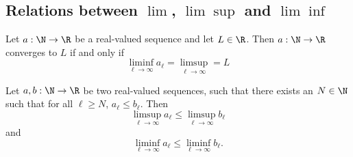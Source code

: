 \subsection{Relations between \texorpdfstring{$\lim$}{lim}, \texorpdfstring{$\lim\sup$}{limsup} and \texorpdfstring{$\lim\inf$}{liminf}}
\begin{proposition}
    Let $a: \N \to \R$ be a real-valued sequence and let $L \in \R$. Then $a: \N \to \R$ converges to $L$ if and only if
    $$\liminf_{\ell\to\infty}a_\ell = \limsup_{\ell\to\infty} = L$$
\end{proposition}

\begin{proposition}
    Let $a,b: \N \to \R$ be two real-valued sequences, such that there exists an $N \in \N$ such that for all $\ell \ge N$,
    $a_\ell \le b_\ell.$ Then
    $$\limsup_{\ell\to\infty}a_\ell \le \limsup_{\ell\to\infty}b_\ell$$ and 
    $$\liminf_{\ell\to\infty}a_\ell \le \liminf_{\ell\to\infty}b_\ell.$$
\end{proposition}
